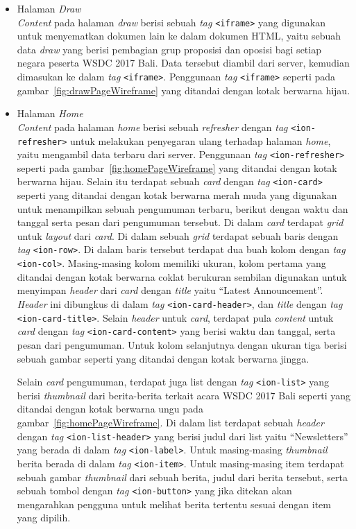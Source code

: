 \begin{enumerate}
\begin{itemize}
				\item Halaman \textit{Draw} \\
					\textit{Content} pada halaman \textit{draw} berisi sebuah \textit{tag} \texttt{<iframe>} yang digunakan untuk menyematkan dokumen lain ke dalam dokumen HTML, yaitu sebuah data \textit{draw} yang berisi pembagian grup proposisi dan oposisi bagi setiap negara peserta WSDC 2017 Bali. Data tersebut diambil dari server, kemudian dimasukan ke dalam \textit{tag} \texttt{<iframe>}. Penggunaan \textit{tag} \texttt{<iframe>} seperti pada gambar~\ref{fig:drawPageWireframe} yang ditandai dengan kotak berwarna hijau.
					
				\item Halaman \textit{Home} \\
					\textit{Content} pada halaman \textit{home} berisi sebuah \textit{refresher} dengan \textit{tag} \texttt{<ion-refresher>} untuk melakukan penyegaran ulang terhadap halaman \textit{home}, yaitu mengambil data terbaru dari server. Penggunaan \textit{tag} \texttt{<ion-refresher>} seperti pada gambar~\ref{fig:homePageWireframe} yang ditandai dengan kotak berwarna hijau. Selain itu terdapat sebuah \textit{card} dengan \textit{tag} \texttt{<ion-card>} seperti yang ditandai dengan kotak berwarna merah muda yang digunakan untuk menampilkan sebuah pengumuman terbaru, berikut dengan waktu dan tanggal serta pesan dari pengumuman tersebut. Di dalam \textit{card} terdapat \textit{grid} untuk \textit{layout} dari \textit{card}. Di dalam sebuah \textit{grid} terdapat sebuah baris dengan \textit{tag} \texttt{<ion-row>}. Di dalam baris tersebut terdapat dua buah kolom dengan \textit{tag} \texttt{<ion-col>}. Masing-masing kolom memiliki ukuran, kolom pertama yang ditandai dengan kotak berwarna coklat berukuran sembilan digunakan untuk menyimpan \textit{header} dari \textit{card} dengan \textit{title} yaitu ``Latest Announcement''. \textit{Header} ini dibungkus di dalam \textit{tag} \texttt{<ion-card-header>}, dan \textit{title} dengan \textit{tag} \texttt{<ion-card-title>}. Selain \textit{header} untuk \textit{card}, terdapat pula \textit{content} untuk \textit{card} dengan \textit{tag} \texttt{<ion-card-content>} yang berisi waktu dan tanggal, serta pesan dari pengumuman. Untuk kolom selanjutnya dengan ukuran tiga berisi sebuah gambar seperti yang ditandai dengan kotak berwarna jingga.
					
					Selain \textit{card} pengumuman, terdapat juga list dengan \textit{tag} \texttt{<ion-list>} yang berisi \textit{thumbnail} dari berita-berita terkait acara WSDC 2017 Bali seperti yang ditandai dengan kotak berwarna ungu pada gambar~\ref{fig:homePageWireframe}. Di dalam list terdapat sebuah \textit{header} dengan \textit{tag} \texttt{<ion-list-header>} yang berisi judul dari list yaitu ``Newsletters'' yang berada di dalam \textit{tag} \texttt{<ion-label>}. Untuk masing-masing \textit{thumbnail} berita berada di dalam \textit{tag} \texttt{<ion-item>}. Untuk masing-masing item terdapat sebuah gambar \textit{thumbnail} dari sebuah berita, judul dari berita tersebut, serta sebuah tombol dengan \textit{tag} \texttt{<ion-button>} yang jika ditekan akan mengarahkan pengguna untuk melihat berita tertentu sesuai dengan item yang dipilih.
				

\end{itemize}
\end{enumerate}
